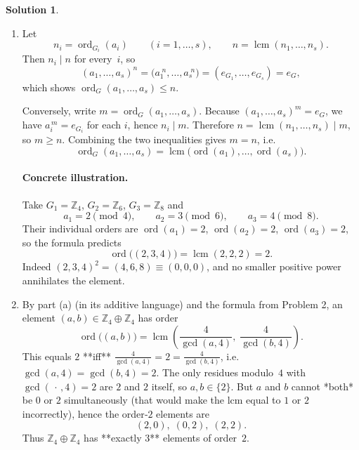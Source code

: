 \documentclass[12pt]{article}
\DeclareMathOperator{\lcm}{lcm}
\DeclareMathOperator{\ord}{ord}
\theoremstyle{definition} %
\newtheorem{solution}{Solution}
\theoremstyle{plain} %
\begin{document}
\begin{solution}
  \begin{enumerate}[label=\textbf{(\alph*)}]
    \item
      Let
      \[
        n_i=\ord_{G_i}(a_i)\qquad(i=1,\dots,s),\qquad
        n=\lcm(n_1,\dots,n_s).
      \]
      Then \(n_i\mid n\) for every~\(i\), so
      \[
        (a_1,\dots,a_s)^{\!n}
        =\bigl(a_1^{\;n},\dots,a_s^{\;n}\bigr)
        =(e_{G_1},\dots,e_{G_s})=e_G,
      \]
      which shows \(\ord_G(a_1,\dots,a_s)\le n\).

      Conversely, write \(m=\ord_G(a_1,\dots,a_s)\).
      Because \((a_1,\dots,a_s)^{\!m}=e_G\),
      we have \(a_i^{\,m}=e_{G_i}\) for each \(i\),
      hence \(n_i\mid m\).
      Therefore \(n=\lcm(n_1,\dots,n_s)\mid m\),
      so \(m\ge n\).
      Combining the two inequalities gives \(m=n\), i.e.
      \[
        \boxed{\ord_G(a_1,\dots,a_s)=\lcm\bigl(\ord(a_1),\dots,\ord(a_s)\bigr)}.
      \]

      \paragraph{Concrete illustration.}
      Take
      \(G_1=\mathbb Z_4\), \(G_2=\mathbb Z_6\), \(G_3=\mathbb Z_8\) and
      \[
        a_1=2\pmod 4,\qquad
        a_2=3\pmod 6,\qquad
        a_3=4\pmod 8.
      \]
      Their individual orders are
      \(\ord(a_1)=2\), \(\ord(a_2)=2\), \(\ord(a_3)=2\),
      so the formula predicts
      \[
        \ord\bigl((2,3,4)\bigr)=\lcm(2,2,2)=2.
      \]
      Indeed
      \((2,3,4)^2=(4,6,8)\equiv(0,0,0)\), and no smaller positive power
      annihilates the element.

    \item
      By part (a) (in its additive language) and the formula from Problem 2,
      an element \((a,b)\in\mathbb Z_4\oplus\mathbb Z_4\) has order
      \[
        \ord\bigl((a,b)\bigr)=\lcm\!\left(
          \frac{4}{\gcd(a,4)},\;
          \frac{4}{\gcd(b,4)}
        \right).
      \]
      This equals \(2\) **iff**
      \(\frac{4}{\gcd(a,4)}=2=\frac{4}{\gcd(b,4)}\), i.e.
      \(\gcd(a,4)=\gcd(b,4)=2\).
      The only residues modulo \(4\) with \(\gcd(\,\cdot\, ,4)=2\)
      are \(2\) and \(2\) itself, so \(a,b\in\{2\}\).
      But \(a\) and \(b\) cannot *both* be \(0\) or \(2\) simultaneously
      (that would make the lcm equal to \(1\) or \(2\) incorrectly),
      hence the order‑\(2\) elements are
      \[
        (2,0),\;(0,2),\;(2,2).
      \]
      Thus \(\mathbb Z_4\oplus\mathbb Z_4\) has **exactly 3**
      elements of order \(2\).


\end{enumerate}
\end{solution}
\end{document}
